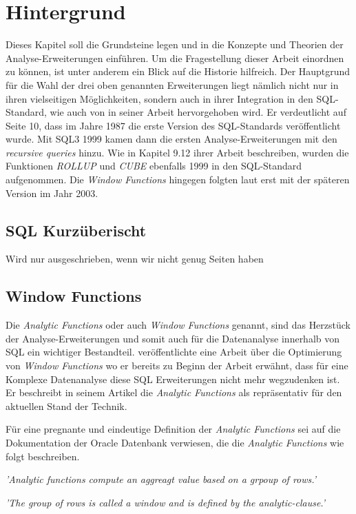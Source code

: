 \chapter{Hintergrund}
Dieses Kapitel soll die Grundsteine legen und in die Konzepte und Theorien der Analyse-Erweiterungen
einführen. Um die Fragestellung dieser Arbeit einordnen zu können, ist unter anderem
ein Blick auf die Historie hilfreich. Der Hauptgrund für die Wahl der drei oben
genannten Erweiterungen liegt nämlich nicht nur in ihren vielseitigen
Möglichkeiten, sondern auch in ihrer Integration in den SQL-Standard, wie auch
von \cite{grust2017advanced} in seiner Arbeit hervorgehoben wird. Er verdeutlicht
auf Seite 10, dass im Jahre 1987 die erste Version des SQL-Standards
veröffentlicht wurde. Mit SQL3 1999 kamen dann die ersten Analyse-Erweiterungen mit
den \textit{recursive queries} hinzu. Wie \cite{melton2001sql} in Kapitel 9.12 ihrer
Arbeit beschreiben, wurden die Funktionen \textit{ROLLUP} und \textit{CUBE}
ebenfalls 1999 in den SQL-Standard aufgenommen. Die \textit{Window Functions}
hingegen folgten laut \cite{grust2017advanced} erst mit der späteren Version im
Jahr 2003.

\section{SQL Kurzüberischt}
Wird nur ausgeschrieben, wenn wir nicht genug Seiten haben

\section{Window Functions}
Die \textit{Analytic Functions} oder auch \textit{Window Functions} genannt,
sind das Herzstück der Analyse-Erweiterungen und somit auch für die Datenanalyse
innerhalb von SQL ein wichtiger Bestandteil. \cite{cao2012optimization} veröffentlichte
eine Arbeit über die Optimierung von \textit{Window Functions} wo er bereits zu
Beginn der Arbeit erwähnt, dass für eine Komplexe Datenanalyse diese SQL Erweiterungen
nicht mehr wegzudenken ist. Er beschreibt in seinem Artikel die \textit{Analytic
Functions} als repräsentativ für den aktuellen Stand der Technik.

Für eine pregnante und eindeutige Definition der \textit{Analytic Functions} sei
auf die Dokumentation der Oracle Datenbank verwiesen, die die \textit{Analytic
Functions} wie folgt beschreiben.

\begin{center}
	\textit{ 'Analytic functions compute an aggreagt value based on a grpoup of
	rows.' } \\ \cite{oracle}

	\textit{ 'The group of rows is called a window and is defined by the analytic-clause.'
	} \\ \cite{oracle}
\end{center}


